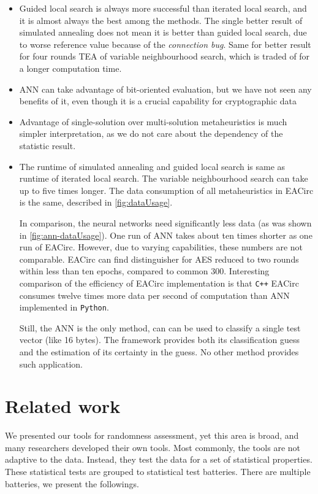 \documentclass[
  print, %
  Table,   %
  nolof,     %
  nolot,     %
  11pt, %
  oneside  %
]{fithesis3}
\begin{document}
\begin{itemize}
    \item Guided local search is always more successful than iterated local search, and it is almost always the best among the methods. The single better result of simulated annealing does not mean it is better than guided local search, due to worse reference value because of the \textit{connection bug}. Same for better result for four rounds TEA of variable neighbourhood search, which is traded of for a longer computation time.
    \item ANN can take advantage of bit-oriented evaluation, but we have not seen any benefits of it, even though it is a crucial capability for cryptographic data
    \item Advantage of single-solution over multi-solution metaheuristics is much simpler interpretation, as we do not care about the dependency of the statistic result.
    \item The runtime of simulated annealing and guided local search is same as runtime of iterated local search. The variable neighbourhood search can take up to five times longer. The data consumption of all metaheuristics in EACirc is the same, described in \cref{fig:dataUsage}.
    
    In comparison, the neural networks need significantly less data (as was shown in \cref{fig:ann-dataUsage}). One run of ANN takes about ten times shorter as one run of EACirc. However, due to varying capabilities, these numbers are not comparable. EACirc can find distinguisher for AES reduced to two rounds within less than ten epochs, compared to common 300. Interesting comparison of the efficiency of EACirc implementation is that \texttt{C++} EACirc consumes twelve times more data per second of computation than ANN implemented in \texttt{Python}.
    
    Still, the ANN is the only method, can can be used to classify a single test vector (like 16 bytes). The framework provides both its classification guess and the estimation of its certainty in the guess. No other method provides such application.
\end{itemize}

\chapter{Related work}
\label{chap:relatwork}

We presented our tools for randomness assessment, yet this area is broad, and many researchers developed their own tools. Most commonly, the tools are not adaptive to the data. Instead, they test the data for a set of statistical properties. These statistical tests are grouped to statistical test batteries. There are multiple batteries, we present the followings.
\end{document}
